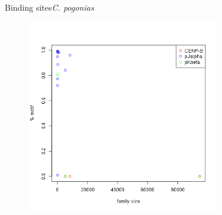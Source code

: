 \documentclass[11pt]{beamer}
\begin{document}
\begin{frame}{Binding sites}{\textit{C. pogonias}}
\begin{center}
	\begin{figure}
		\includegraphics[width=0.75\textwidth]{img/Cp_motifs.png}
	\end{figure}	
\end{center}
\end{frame}
\end{document}
